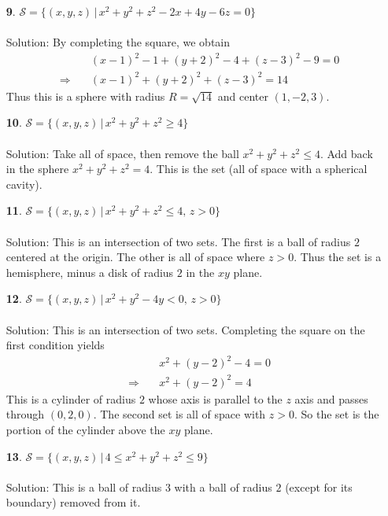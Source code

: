 \documentclass[12pt]{amsbook}
\let\cal\mathcal
\begin{document}
\begin{enumerate}
  \item[{\small\bf 9}.] ${\cal S}=\{(x,y,z)\,|\, x^2+y^2 + z^2 -2x +4y- 6z=0\}$ \\
\\
{\sc Solution}: By completing the square, we obtain
\begin{eqnarray*}
&&\quad (x-1)^2-1+(y+2)^2-4+(z-3)^2-9=0\\
&\Rightarrow&\quad
(x-1)^2+(y+2)^2+(z-3)^2=14
\end{eqnarray*}
Thus this is a sphere with radius $R=\sqrt{14}$ and center $(1,-2,3)$.
\\
  \item[{\small  \bf 10}.] ${\cal S}=\{(x,y,z)\,|\, x^2+y^2+z^2\geq 4\}$\\
\\
{\sc Solution}: Take all of space, then remove the ball $x^2+y^2+z^2\leq 4$. Add back in the sphere $x^2+y^2+z^2=4$. This is the set (all of space with a spherical cavity).
\\
  \item[{\small\bf 11}.]  ${\cal S}=\{(x,y,z)\,|\, x^2+y^2+z^2\leq 4, \, z>0\}$ \\
\\
{\sc Solution}: This is an intersection of two sets. The first is a ball of radius $2$ centered at the origin. The other is all of space where $z>0$. Thus the set is a hemisphere, minus a disk of radius $2$ in the $xy$ plane.
\\
  \item[{\small\bf 12}.] ${\cal S}=\{(x,y,z)\,|\, x^2+y^2-4y <0,\,  z>0\}$\\
\\
{\sc Solution}: This is an intersection of two sets. Completing the square on the first condition yields
\begin{eqnarray*}
&&\quad x^2+(y-2)^2-4=0\\
&\Rightarrow&\quad
x^2+(y-2)^2=4
\end{eqnarray*}
This is a cylinder of radius $2$ whose axis is parallel to the $z$ axis and passes through $(0,2,0)$. The second set is all of space with $z>0$. So the set is the portion of the cylinder above the $xy$ plane.
\\
  \item[{\small\bf 13}.] ${\cal S}=\{(x,y,z)\,|\, 4\leq x^2+y^2+z^2\leq 9\}$ \\
\\
{\sc Solution}: This is a ball of radius $3$ with a ball of radius $2$ (except for its boundary) removed from it. 

\end{enumerate}
\end{document}

